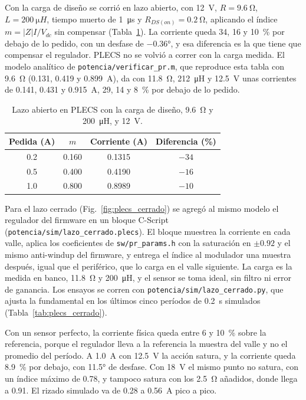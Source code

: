 \documentclass[journal]{IEEEtran}
\begin{document}
Con la carga de diseño se corrió en lazo abierto, con \SI{12}{V}, $R=\SI{9.6}{\ohm}$, $L=\SI{200}{\micro H}$, tiempo muerto de \SI{1}{\micro s} y $R_{DS(on)}=\SI{0.2}{\ohm}$, aplicando el índice $m=|Z|I/V_{dc}$ sin compensar (Tabla~\ref{tab:plecs_abierto}). La corriente queda \num{34}, \num{16} y \SI{10}{\percent} por debajo de lo pedido, con un desfase de $-\ang{0.36}$, y esa diferencia es la que tiene que compensar el regulador. PLECS no se volvió a correr con la carga medida. El modelo analítico de \texttt{potencia/verificar\_pr.m}, que reproduce esta tabla con \SI{9.6}{\ohm} (\num{0.131}, \num{0.419} y \SI{0.899}{A}), da con \SI{11.8}{\ohm}, \SI{212}{\micro H} y \SI{12.5}{V} unas corrientes de \num{0.141}, \num{0.431} y \SI{0.915}{A}, \num{29}, \num{14} y \SI{8}{\percent} por debajo de lo pedido.

\begin{table}[!ht]
	\centering
	\caption{Lazo abierto en PLECS con la carga de diseño, \SI{9.6}{\ohm} y \SI{200}{\micro H}, y \SI{12}{V}.}
	\label{tab:plecs_abierto}
	\begin{tabular}{cccc}
		\toprule
		Pedida (A) & $m$ & Corriente (A) & Diferencia (\%) \\
		\midrule
		\num{0.2} & \num{0.160} & \num{0.1315} & $-34$ \\
		\num{0.5} & \num{0.400} & \num{0.4190} & $-16$ \\
		\num{1.0} & \num{0.800} & \num{0.8989} & $-10$ \\
		\bottomrule
	\end{tabular}
\end{table}

Para el lazo cerrado (Fig.~\ref{fig:plecs_cerrado}) se agregó al mismo modelo el regulador del firmware en un bloque C-Script (\texttt{potencia/sim/lazo\_cerrado.plecs}). El bloque muestrea la corriente en cada valle, aplica los coeficientes de \texttt{sw/pr\_params.h} con la saturación en $\pm\num{0.92}$ y el mismo anti-windup del firmware, y entrega el índice al modulador una muestra después, igual que el periférico, que lo carga en el valle siguiente. La carga es la medida en banco, \SI{11.8}{\ohm} y \SI{200}{\micro H}, y el sensor se toma ideal, sin filtro ni error de ganancia. Los ensayos se corren con \texttt{potencia/sim/lazo\_cerrado.py}, que ajusta la fundamental en los últimos cinco períodos de \SI{0.2}{s} simulados (Tabla~\ref{tab:plecs_cerrado}).

Con un sensor perfecto, la corriente física queda entre \num{6} y \SI{10}{\percent} sobre la referencia, porque el regulador lleva a la referencia la muestra del valle y no el promedio del período. A \SI{1.0}{A} con \SI{12.5}{V} la acción satura, y la corriente queda \SI{8.9}{\percent} por debajo, con \ang{11.5} de desfase. Con \SI{18}{V} el mismo punto no satura, con un índice máximo de \num{0.78}, y tampoco satura con los \SI{2.5}{\ohm} añadidos, donde llega a \num{0.91}. El rizado simulado va de \num{0.28} a \SI{0.56}{A} pico a pico.
\end{document}
